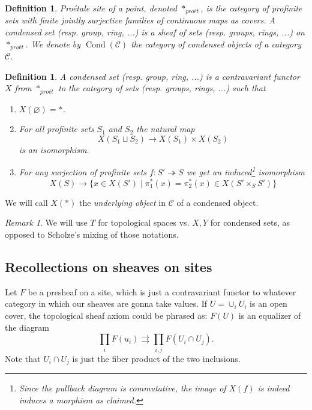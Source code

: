 \documentclass[12pt]{article}
\theoremstyle{darkgreentheorem}
\theoremstyle{darkbluedefinition}
\newtheorem{defn}[thm]{Definition}
\theoremstyle{darkredexample}
\theoremstyle{remark}
\newtheorem{rem}[thm]{Remark}
\newcommand{\1}{\mathbbm{1}}
\newcommand{\scrC}{\mathscr{C}}
\DeclareMathOperator{\Cond}{Cond}
\newcommand{\pe}{*_{proét}}
\newcommand{\fp}[1]{\times_{#1}}
\begin{document}
\begin{defn}
    Pro\'{e}tale site of a point, denoted $\pe$, is the category of profinite sets with finite jointly surjective families of continuous maps as covers.
    A \textit{condensed set} (resp. group, ring, ...) is a sheaf of sets (resp. groups, rings, ...) on $\pe$.
    We denote by $\Cond(\scrC)$ the category of condensed objects of a category $\scrC$.
\end{defn}

\begin{defn}
    A \textit{condensed set} (resp. group, ring, ...) is a contravariant functor $X$ from $\pe$ to the category of sets (resp. groups, rings, ...) such that 
    \begin{enumerate}[label=\roman*)]
	\item $X(\varnothing)=*$.
	\item For all profinite sets $S_{1}$ and $S_{2}$ the natural map
	    \[ X(S_{1}\sqcup S_{2})\to X(S_{1})\times X(S_{2}) \]
	    is an isomorphism.
	\item For any surjection of profinite sets $f\colon S'\twoheadrightarrow S$ we get an induced\footnote{Since the pullback diagram is commutative, the image of $X(f)$ is indeed induces a morphism as claimed.} isomorphism
	    \[ X(S)\to \{ x\in X(S')\mid \pi_{1}^{*}(x)=\pi_{2}^{*}(x)\in X(S'\fp{S}S')\} \]
    \end{enumerate}
\end{defn}

We will call $X(*)$ the \textit{underlying object} in $\scrC$ of a condensed object.

\begin{rem}
    We will use $T$ for topological spaces vs. $X,Y$ for condensed sets, as opposed to Scholze's mixing of those notations.
\end{rem}

\subsection{Recollections on sheaves on sites}

Let $F$ be a presheaf on a site, which is just a contravariant functor to whatever category in which our sheaves are gonna take values.
If $U=\cup_{i}U_{i}$ is an open cover, the topological sheaf axiom could be phrased as: $F(U)$ is an equalizer of the diagram
\[ \prod_{i}F(u_{i})\rightrightarrows \prod_{i,j}F(U_{i}\cap U_{j}). \]
Note that $U_{i}\cap U_{j}$ is just the fiber product of the two inclusions.
\end{document}
